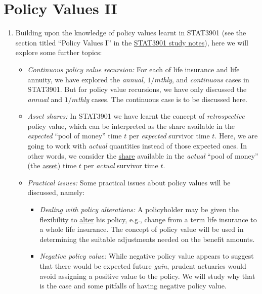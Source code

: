 \section{Policy Values II}
\label{sect:policy-values}
\begin{enumerate}
\item Building upon the knowledge of policy values learnt in STAT3901 (see the
section titled ``Policy Values I'' in the
\href{https://leochiukl.github.io/files/stat3901-study-notes.pdf}{STAT3901
study notes}), here we will explore some further topics:
\begin{itemize}
\item \emph{Continuous policy value recursion:} For each of life insurance and
life annuity, we have explored the \emph{annual}, \emph{\(1/m\)thly}, and
\emph{continuous} cases in STAT3901. But for policy value recursions, we have
only discussed the \emph{annual} and \emph{\(1/m\)thly} cases. The continuous
case is to be discussed here.

\item \emph{Asset shares:} In STAT3901 we have learnt the concept of
\emph{retrospective} policy value, which can be interpreted as the share
available in the \emph{expected} ``pool of money''  time \(t\) per
\emph{expected} survivor  time \(t\).  Here, we are going to work
with \emph{actual} quantities instead of those expected ones. In other words,
we consider the \underline{share} available in the \emph{actual} ``pool of
money'' (the \underline{asset})  time \(t\) per \emph{actual}
survivor  time \(t\).

\item \emph{Practical issues:} Some practical issues about policy values will
be discussed, namely:
\begin{itemize}
\item \emph{Dealing with policy alterations:} A policyholder may be given the
flexibility to \underline{alter} his policy, e.g., change from a term life
insurance to a whole life insurance. The concept of policy value will be used
in determining the suitable adjustments needed on the benefit amounts.
\item \emph{Negative policy value:} While negative policy value appears to
suggest that there would be expected future \emph{gain}, prudent actuaries
would avoid assigning a positive value to the policy. We will study why that is
the case and some pitfalls of having negative policy value.
\end{itemize}
\end{itemize}
\end{enumerate}
